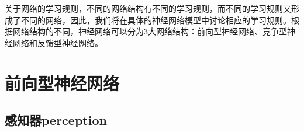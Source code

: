             \par
            关于网络的学习规则，不同的网络结构有不同的学习规则，而不同的学习规则又形成了不同的网络，因此，我们将在具体的神经网络模型中讨论相应的学习规则。根据网络结构的不同，神经网络可以分为3大网络结构：前向型神经网络、竞争型神经网络和反馈型神经网络。

\section{前向型神经网络}
    \subsection{感知器perception}
